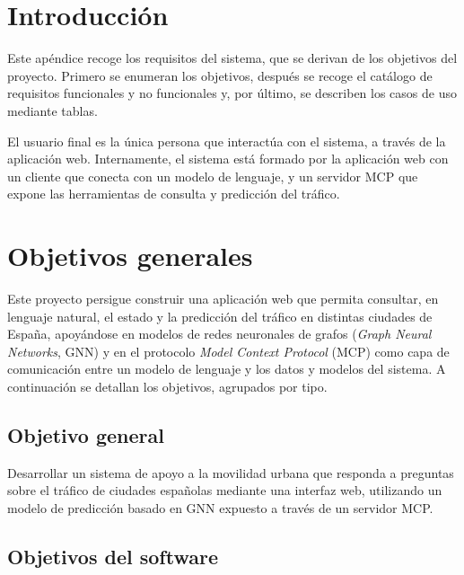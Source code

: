 
\section{Introducción}

Este apéndice recoge los requisitos del sistema, que se derivan de los objetivos del proyecto. Primero se enumeran los objetivos, después se recoge el catálogo de requisitos funcionales y no funcionales y, por último, se describen los casos de uso mediante tablas.

El usuario final es la única persona que interactúa con el sistema, a través de la aplicación web. Internamente, el sistema está formado por la aplicación web con un cliente que conecta con un modelo de lenguaje, y un servidor MCP que expone las herramientas de consulta y predicción del tráfico.

\section{Objetivos generales}

Este proyecto persigue construir una aplicación web que permita consultar, en lenguaje natural, el estado y la predicción del tráfico en distintas ciudades de España, apoyándose en modelos de redes neuronales de grafos (\textit{Graph Neural Networks}, GNN) y en el protocolo \textit{Model Context Protocol} (MCP) como capa de comunicación entre un modelo de lenguaje y los datos y modelos del sistema. A continuación se detallan los objetivos, agrupados por tipo.

\subsection{Objetivo general}

Desarrollar un sistema de apoyo a la movilidad urbana que responda a preguntas sobre el tráfico de ciudades españolas mediante una interfaz web, utilizando un modelo de predicción basado en GNN expuesto a través de un servidor MCP.

\subsection{Objetivos del software}

